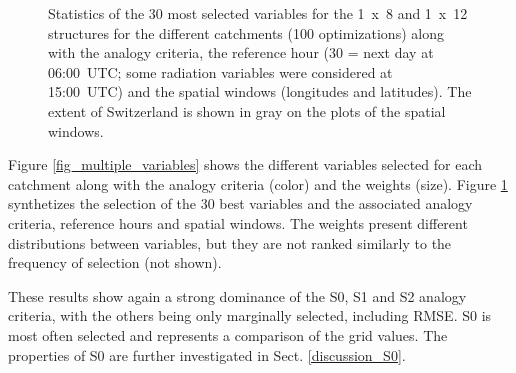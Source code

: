 \documentclass[draft]{agujournal2019}
\begin{document}
\begin{figure}[H]
	\noindent{}
	\caption{Statistics of the 30 most selected variables for the 1~x~8 and 1~x~12 structures for the different catchments (100 optimizations) along with the analogy criteria, the reference hour (30 = next day at 06:00~UTC; some radiation variables were considered at 15:00~UTC) and the spatial windows (longitudes and latitudes). The extent of Switzerland is shown in gray on the plots of the spatial windows.}
	\label{fig_stats_params}
\end{figure}


Figure \ref{fig_multiple_variables} shows the different variables selected for each catchment along with the analogy criteria (color) and the weights (size). Figure \ref{fig_stats_params} synthetizes the selection of the 30 best variables and the associated analogy criteria, reference hours and spatial windows. The weights present different distributions between variables, but they are not ranked similarly to the frequency of selection (not shown).

These results show again a strong dominance of the S0, S1 and S2 analogy criteria, with the others being only marginally selected, including RMSE. S0 is most often selected and represents a comparison of the grid values. The properties of S0 are further investigated in Sect. \ref{discussion_S0}.  
\end{document}
